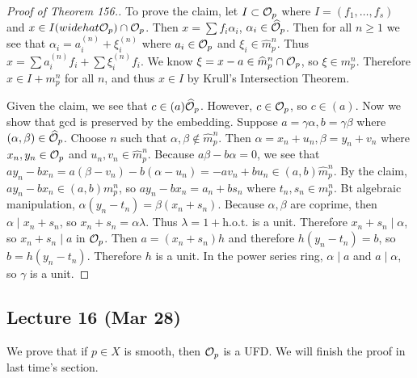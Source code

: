 \documentclass[twoside, 10pt]{article}
\begin{document}
\begin{thm}
\begin{proof}[Proof of Theorem 156.]
            To prove the claim, let $I \subset \mathcal{O}_p$ where $I = (f_1,
            \ldots, f_s)$ and $x \in I (widehat{\mathcal{O}}_p) \cap \mathcal{O}_p$. Then
            $x = \sum f_i \alpha_i$, $\alpha_i \in \widehat{\mathcal{O}}_p$. Then
            for all $n \geq 1$ we see that $\alpha_i = a_i^{(n)} + \xi_i^{(n)}$
            where $a_i \in \mathcal{O}_p$ and $\xi_i \in \widehat{m}_p^n$. Thus $x =
            \sum a_i^{(n)} f_i + \sum \xi_i^{(n)} f_i$. We know $\xi = x-a \in
            \widehat{m}_p^n \cap \mathcal{O}_p$, so $\xi \in m_p^n$. Therefore $x
            \in I + m_p^n$ for all $n$, and thus $x \in I$ by Krull's
            Intersection Theorem.

            Given the claim, we see that $c \in (a)\widehat{\mathcal{O}}_p$.
            However, $c \in \mathcal{O}_p$, so $c \in (a)$. Now we show that gcd is
            preserved by the embedding. Suppose $a = \gamma \alpha, b =
            \gamma\beta$ where $(\alpha, \beta) \in \widehat{\mathcal{O}}_p$. Choose
            $n$ such that $\alpha, \beta \notin \widehat{m}_p^n$. Then $\alpha
            = x_n+u_n, \beta = y_n+v_n$ where $x_n, y_n \in \mathcal{O}_p$ and $u_n,
            v_n \in \widehat{m}_p^n$. Because $a \beta - b \alpha = 0$, we see
            that $ay_n - bx_n = a(\beta - v_n) - b (\alpha - u_n) = -av_n +
            bu_n \in (a,b)\widehat{m}_p^n$. By the claim, $ay_n - bx_n \in
            (a,b)m_p^n$, so $ay_n - bx_n = a_n + bs_n$ where $t_n,s_n \in
            m_p^n$. Bt algebraic manipulation, $\alpha(y_n-t_n) =
            \beta(x_n+s_n)$. Because $\alpha, \beta$ are coprime, then $\alpha
            \mid x_n+s_n$, so $x_n+s_n = \alpha \lambda$. Thus $\lambda = 1 +
            \mathrm{h.o.t.}$ is a unit. Therefore $x_n+s_n \mid \alpha$, so
            $x_n + s_n \mid a$ in $\mathcal{O}_p$. Then $a = (x_n+s_n)h$ and
            therefore $h(y_n-t_n) = b$, so $b = h(y_n-t_n)$. Therefore $h$ is a
        unit. In the power series ring, $\alpha \mid a$ and $a \mid \alpha$, so
    $\gamma$ is a unit.  \end{proof} \end{thm}

    \subsection{Lecture 16 (Mar 28)} We prove that if $p \in X$ is smooth, then
    $\mathcal{O}_p$ is a UFD. We will finish the proof in last time's section.
    
\end{document}
